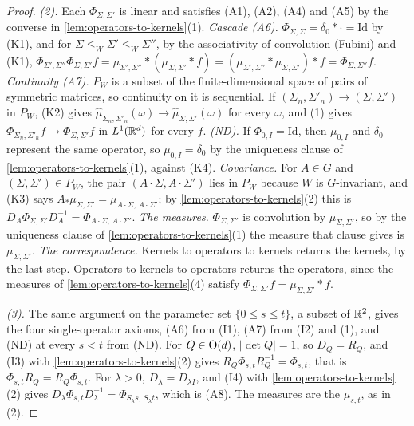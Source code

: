 \begin{proof}
\emph{(2).} Each $\Phi_{\Sigma,\Sigma'}$ is linear and satisfies (A1), (A2), (A4) and (A5) by the
converse in \ref{lem:operators-to-kernels}(1). \emph{Cascade (A6).} $\Phi_{\Sigma,\Sigma} = \delta_0 * \cdot
= \mathrm{Id}$ by (K1), and for $\Sigma \le_W \Sigma' \le_W \Sigma''$, by the associativity of
convolution (Fubini) and (K1),
$\Phi_{\Sigma',\Sigma''}\Phi_{\Sigma,\Sigma'}f = \mu_{\Sigma',\Sigma''} * (\mu_{\Sigma,\Sigma'} * f)
= (\mu_{\Sigma',\Sigma''} * \mu_{\Sigma,\Sigma'}) * f = \Phi_{\Sigma,\Sigma''}f$.
\emph{Continuity (A7).} $P_W$ is a subset of the finite-dimensional space of pairs of symmetric matrices,
so continuity on it is sequential. If $(\Sigma_n,\Sigma'_n) \to (\Sigma,\Sigma')$ in $P_W$, (K2) gives
$\widehat\mu_{\Sigma_n,\Sigma'_n}(\omega) \to \widehat\mu_{\Sigma,\Sigma'}(\omega)$ for every $\omega$,
and (1) gives $\Phi_{\Sigma_n,\Sigma'_n}f \to \Phi_{\Sigma,\Sigma'}f$ in $L^1(\mathbb{R}^d)$ for every $f$.
\emph{(ND).} If $\Phi_{0,I} = \mathrm{Id}$, then $\mu_{0,I}$ and $\delta_0$ represent the same
operator, so $\mu_{0,I} = \delta_0$ by the uniqueness clause of \ref{lem:operators-to-kernels}(1),
against (K4). \emph{Covariance.} For $A \in G$ and $(\Sigma,\Sigma') \in P_W$, the pair
$(A\cdot\Sigma, A\cdot\Sigma')$ lies in $P_W$ because $W$ is $G$-invariant, and (K3) says
$A_*\mu_{\Sigma,\Sigma'} = \mu_{A\cdot\Sigma,\,A\cdot\Sigma'}$; by \ref{lem:operators-to-kernels}(2)
this is $D_A\Phi_{\Sigma,\Sigma'}D_A^{-1} = \Phi_{A\cdot\Sigma,\,A\cdot\Sigma'}$. \emph{The measures.}
$\Phi_{\Sigma,\Sigma'}$ is convolution by $\mu_{\Sigma,\Sigma'}$, so by the uniqueness clause of
\ref{lem:operators-to-kernels}(1) the measure that clause gives is $\mu_{\Sigma,\Sigma'}$. \emph{The
correspondence.} Kernels to operators to kernels returns the kernels, by the last step. Operators to
kernels to operators returns the operators, since the measures of
\ref{lem:operators-to-kernels}(4) satisfy $\Phi_{\Sigma,\Sigma'}f = \mu_{\Sigma,\Sigma'} * f$.

\emph{(3).} The same argument on the parameter set $\{0 \le s \le t\}$, a subset of $\mathbb{R}^2$, gives the
four single-operator axioms, (A6) from (I1), (A7) from (I2) and (1), and (ND) at every $s < t$ from
(ND). For $Q \in \mathrm{O}(d)$, $|\det Q| = 1$, so $D_Q = R_Q$, and (I3) with
\ref{lem:operators-to-kernels}(2) gives $R_Q\Phi_{s,t}R_Q^{-1} = \Phi_{s,t}$, that is
$\Phi_{s,t}R_Q = R_Q\Phi_{s,t}$. For $\lambda > 0$, $D_\lambda = D_{\lambda I}$, and (I4) with
\ref{lem:operators-to-kernels}(2) gives $D_\lambda\Phi_{s,t}D_\lambda^{-1} =
\Phi_{S_\lambda s,\,S_\lambda t}$, which is (A8). The measures are the $\mu_{s,t}$, as in (2).
\end{proof}

